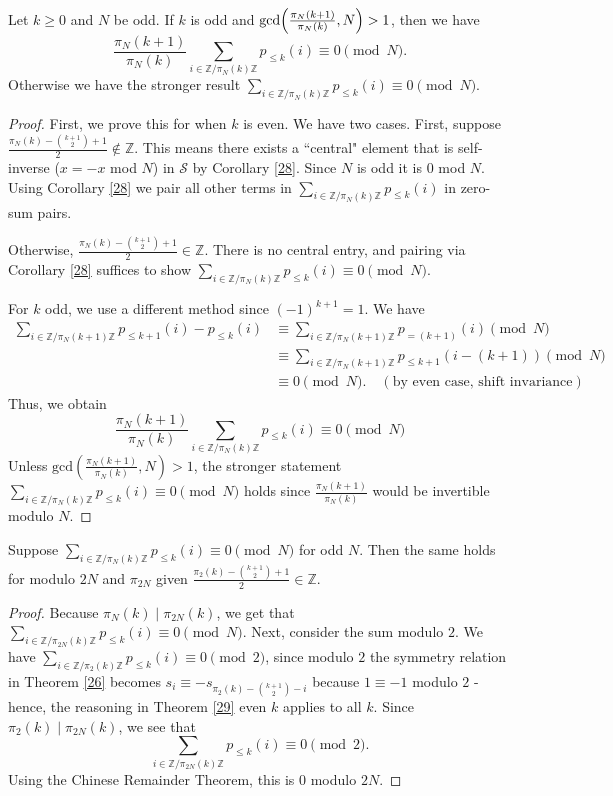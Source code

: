 \documentclass[12pt]{article}
\newcommand{\bra}[1]{{\left({#1}\right)}}
\newcommand{\Z}{\mathbb{Z}}
\begin{document}
\begin{theorem}
Let $k\ge 0$ and $N$ be odd.  If $k$ is odd and $\textup{gcd}\bra{\frac{\pi_N(k+1)}{\pi_N(k)}, N}>1$, then we have
\[\frac{\pi_N(k+1)}{\pi_N(k)}\sum_{i\in \Z/\pi_N(k)\Z}{p_{\le k}(i)}\equiv 0 \pmod{N}.\]
Otherwise we have the stronger result $\sum_{i\in \Z/\pi_N(k)\Z}{p_{\le k}(i)}\equiv 0 \pmod{N}$.
\label{29}
\end{theorem}
\begin{proof}
First, we prove this for when $k$ is even. We have two cases. First, suppose $\frac{\pi_N(k)-\binom{k+1}{2}+1}{2}\not \in \Z$. This means there exists a ``central" element that is self-inverse ($x=-x$ mod $N$) in $\mathcal{S}$ by Corollary \ref{28}. Since $N$ is odd it is $0$ mod $N$. Using Corollary \ref{28} we pair all other terms in $\sum_{i\in \Z/\pi_N(k)\Z}{p_{\le k}(i)}$ in zero-sum pairs.

Otherwise, $\frac{\pi_N(k)-\binom{k+1}{2}+1}{2}\in \Z$. There is no central entry, and pairing via Corollary \ref{28} suffices to show $\sum_{i\in \Z/\pi_N(k)\Z}{p_{\le k}(i)} \equiv 0 \pmod{N}$.


For $k$ odd, we use a different method since $(-1)^{k+1}=1$. We have
\begin{align*}
\sum_{i\in \Z/\pi_N(k+1)\Z}{p_{\le k+1}(i)-p_{\le k}(i)} &\equiv \sum_{i\in \Z/\pi_N(k+1)\Z}{p_{=(k+1)}(i)} \pmod{N}\\
&\equiv \sum_{i\in \Z/\pi_N(k+1)\Z}{p_{\le k+1}(i-(k+1))} \pmod{N}\\
&\equiv 0 \pmod{N}. \quad (\text{by even case, shift invariance})
\end{align*}
Thus, we obtain
\[\frac{\pi_N(k+1)}{\pi_N(k)}\sum_{i\in \Z/\pi_N(k)\Z}{p_{\le k}(i)}\equiv 0 \pmod{N}\]
Unless $\text{gcd}\bra{\frac{\pi_N(k+1)}{\pi_N(k)}, N}>1$, the stronger statement  $\sum_{i\in \Z/\pi_N(k)\Z}{p_{\le k}(i)}\equiv 0 \pmod{N}$ holds since $\frac{\pi_N(k+1)}{\pi_N(k)}$ would be invertible modulo $N$.
\end{proof}

\begin{corollary}
Suppose $\sum_{i\in \Z/\pi_N(k)\Z}{p_{\le k}(i)}\equiv 0\pmod{N}$ for odd $N$. Then the same holds for modulo $2N$ and $\pi_{2N}$ given $\frac{\pi_2(k)-\binom{k+1}{2}+1}{2}\in \Z$. \label{210}
\end{corollary}

\begin{proof}
Because $\pi_N(k)\mid \pi_{2N}(k)$, we get that $\sum_{i\in \Z/\pi_{2N}(k)\Z}{p_{\le k}(i)}\equiv 0\pmod{N}$. Next, consider the sum modulo $2$. We have $\sum_{i\in \Z/\pi_2(k)\Z}{p_{\le k}(i)} \equiv 0 \pmod{2}$, since modulo $2$ the symmetry relation in Theorem \ref{26} becomes $s_i \equiv - s_{\pi_2(k)-\binom{k+1}{2}-i}$ because $1\equiv -1$ modulo $2$ - hence, the reasoning in Theorem \ref{29} even $k$ applies to all $k$. Since $\pi_2(k) \mid \pi_{2N}(k)$, we see that
\[\sum_{i\in \Z/\pi_{2N}(k)\Z}{p_{\le k}(i)}\equiv 0\pmod{2}.\]
Using the Chinese Remainder Theorem, this is $0$ modulo $2N$.
\end{proof}
\end{document}
